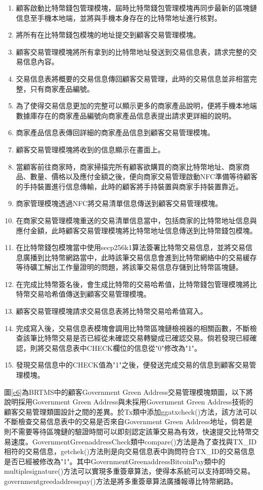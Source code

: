 	\begin{enumerate}
		\item 顧客啟動比特幣錢包管理模塊，屆時比特幣錢包管理模塊再同步最新的區塊鏈信息至手機本地端，並將與手機本身存在的比特幣地址進行核對。
		\item 將所有在比特幣錢包模塊的地址提交到顧客交易管理模塊。
		\item 顧客交易管理模塊將所有拿到的比特幣地址發送到交易信息表，請求完整的交易信息內容。
		\item 交易信息表將概要的交易信息傳回顧客交易管理，此時的交易信息並非相當完整，只有商家產品編號。
		\item 為了使得交易信息更加的完整可以顯示更多的商家產品說明，便將手機本地端數據庫存在的商家產品編號向商家產品信息表提出請求更詳細的說明。
		\item 商家產品信息表傳回詳細的商家產品信息到顧客交易管理模塊。
		\item 顧客交易管理模塊將收到的信息顯示在畫面上。
		\item 當顧客前往商家時，商家掃描完所有顧客欲購買的商家比特幣地址、商家商品、數量、價格以及應付金額之後，便向商家交易管理啟動NFC準備等待顧客的手持裝置進行信息傳輸，此時的顧客將手持裝置與商家手持裝置靠近。
		\item 商家管理模塊透過NFC將交易清單信息傳送到顧客交易管理模塊。
		\item 在商家交易管理模塊重送的交易清單信息當中，包括商家的比特幣地址信息與應付金額，此時顧客交易管理模塊將比特幣地址信息傳送到比特幣錢包模塊。
		\item 在比特幣錢包模塊當中使用secp256k1算法簽署比特幣交易信息，並將交易信息廣播到比特幣網路當中，此時該筆交易信息會進到⽐特幣網絡中的交易緩存等待礦工解出工作量證明的問題，將該筆交易信息存儲到比特幣區塊鏈。
		\item 在完成比特幣簽名後，會生成比特幣的交易哈希值，比特幣錢包管理模塊將比特幣交易哈希值傳送到顧客交易管理模塊。
		\item 顧客交易管理模塊請求交易信息表將比特幣交易哈希值寫入。
		\item 完成寫入後，交易信息表模塊會調用比特幣區塊鏈檢視器的相關函數，不斷檢查該筆比特幣交易是否已經從未確認交易轉變成已確認交易。倘若發現已經確認，則將交易信息表中CHECK欄位的信息從"0"修改為"1"。
		\item 發現交易信息中的CHECK值為"1"之後，便發送完成交易的信息到顧客交易管理模塊。
	\end{enumerate}

	圖\ref{c6}為BRTMS中的顧客Government Green Address交易管理模塊類圖，以下將說明採用Government Green Address與未採用Government Green Address技術的顧客交易管理類圖設計之間的差異。於Tx類中添加ggatxcheck()方法，該方法可以不斷檢查交易信息表中的交易是否來自Government Green Address地址，倘若是則不需要等待區塊鏈的驗證時間可以即刻認定該筆交易為有效，快速提交比特幣交易速度。GovernmentGreenaddressCheck類中compare()方法是為了查找與TX\_ID相符的交易信息，getchek()方法則是向交易信息表中詢問符合TX\_ID的交易信息是否已經被修改為"1"。其中GovernmentGreenaddressBitcoinPay類中的multiplesignature()方法可以實現多重簽章算法，使得本系統可以支持即時交易。governmentgreedaddresspay()方法是將多重簽章算法廣播報導比特幣網路。


